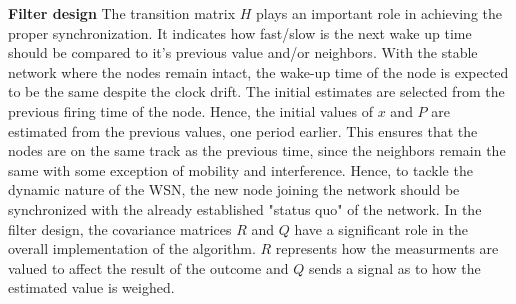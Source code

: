\documentclass[journal]{IEEEtran}
\begin{document}
\textbf{Filter design} \newline
The transition matrix $H$ plays an important role in achieving
the proper synchronization. It indicates how fast/slow is the next wake up time should be compared
to it's previous value and/or neighbors. With the stable network where the nodes remain intact,
the wake-up time of the node is expected to be the same despite the
clock drift.
\newline
The initial estimates are selected from the previous firing time of the node.
Hence, the initial values of $x$ and $P$ are estimated from the previous values, one period earlier.
This ensures that the nodes are on the same track as the previous time, since the neighbors
remain the same with some exception of mobility and interference.
Hence, to tackle the dynamic nature of the WSN, the
new node joining the network should be synchronized with the already
established "status quo" of the network.
In the filter design, the covariance matrices $R$ and $Q$ have a significant
role in the overall implementation of the algorithm. $R$ represents how
 the measurments are valued to affect the result of the outcome and $Q$
sends a signal as to how the estimated value is weighed.
\end{document}

